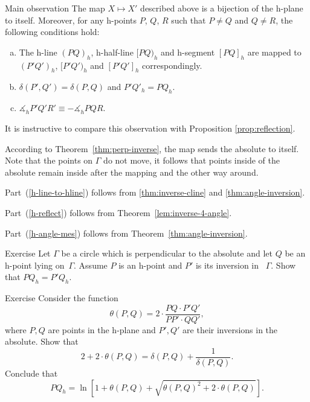 \begin{thm}{Main observation}\label{thm:main-observ}
The map $X\mapsto X'$ described above is a bijection of the h-plane to itself. 
Moreover, for any h-points $P$, $Q$, $R$ such that $P\ne Q$ and $Q\ne R$, the following conditions hold:
\begin{enumerate}[(a)]
\item\label{h-line-to-hline} The h-line $(PQ)_h$, h-half-line $[PQ)_h$ and h-segment $[PQ]_h$ are mapped to  $(P'Q')_h$, $[P'Q')_h$ and $[P'Q']_h$ correspondingly.
\item\label{h-reflect} $\delta(P',Q')=\delta(P,Q)$ and $P'Q'_h=PQ_h$.
\item\label{h-angle-mes} 
$\measuredangle_h P'Q'R'\equiv-\measuredangle_h PQR$.
\end{enumerate}

\end{thm}

It is instructive to compare this observation with Proposition \ref{prop:reflection}.

According to Theorem~\ref{thm:perp-inverse}, the map sends the absolute to itself. 
Note that the points on $\Gamma$ do not move, it follows that points inside of the absolute remain inside after the mapping and the other way around. 


Part~(\ref{h-line-to-hline}) follows from \ref{thm:inverse-cline} and \ref{thm:angle-inversion}.

Part~(\ref{h-reflect}) follows from Theorem~\ref{lem:inverse-4-angle}.

Part~(\ref{h-angle-mes})  follows from Theorem~\ref{thm:angle-inversion}.
\qeds


\begin{thm}{Exercise}\label{ex:h-reflection}
Let $\Gamma$ be a circle which is perpendicular to the absolute and let $Q$ be an h-point lying on~$\Gamma$.
Assume $P$ is an h-point and $P'$ is its inversion in ~$\Gamma$.
Show that $PQ_h=P'Q_h$.
\end{thm}

\begin{thm}{Exercise}\label{ex:def-delta}
Consider the function
\[\theta(P,Q)=2\cdot\frac{PQ\cdot  P'Q'}{PP'\cdot QQ'},\]
where $P, Q$ are points in the h-plane
and $P', Q'$ are their inversions in the absolute.
Show that 
\[2+2\cdot\theta(P,Q)
=
\delta(P,Q)+\frac{1}{\delta(P,Q)}.\]
Conclude that
\[PQ_h=\ln\left[1+\theta(P,Q)+\sqrt{\theta(P,Q)^2+2\cdot\theta(P,Q)}\right].\]

\end{thm}


